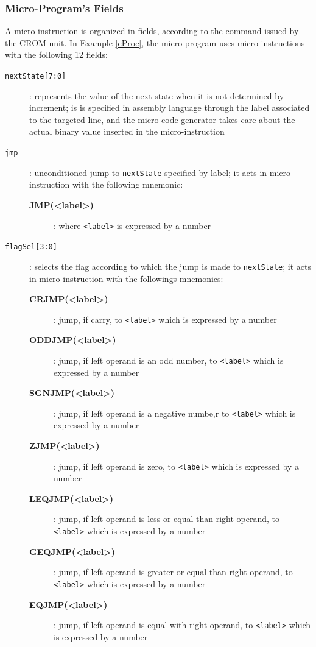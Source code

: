 \subsubsection{Micro-Program's Fields}

A micro-instruction is organized in fields, according to the command issued by the CROM unit. In Example \ref{eProc}, the micro-program uses micro-instructions with the following 12 fields:
\begin{description}
    \item[{\tt nextState[7:0]}]: represents the value of the next state when it is not determined by increment; is is specified in assembly language through the label associated to the targeted line, and the micro-code generator takes care about the actual binary value inserted in the micro-instruction
    \item[{\tt jmp}]: unconditioned jump to {\tt nextState} specified by label; it acts in micro-instruction with the following mnemonic:
        \begin{description}
            \item[{\bf  JMP(<label>)}]: where {\tt <label>} is expressed by a number
        \end{description}
    \item[{\tt flagSel[3:0]}]: selects the flag according to which the jump is made to  {\tt nextState}; it acts in micro-instruction with the followings mnemonics:
    \begin{description}
        \item[{\bf CRJMP(<label>)}]: jump, if carry, to {\tt <label>} which is expressed by a number
        \item[{\bf ODDJMP(<label>)}]: jump, if left operand is an odd number, to {\tt <label>} which is expressed by a number
        \item[{\bf SGNJMP(<label>)}]: jump, if left operand is a negative numbe,r  to {\tt <label>} which is expressed by a number
        \item[{\bf ZJMP(<label>)}]: jump, if left operand is zero,  to {\tt <label>} which is expressed by a number
        \item[{\bf LEQJMP(<label>)}]: jump, if left operand is less or equal than right operand,  to {\tt <label>} which is expressed by a number
        \item[{\bf GEQJMP(<label>)}]: jump, if left operand is greater or equal than right operand,  to {\tt <label>} which is expressed by a number
        \item[{\bf EQJMP(<label>)}]: jump, if left operand is  equal with right operand,  to {\tt <label>} which is expressed by a number

\end{description}
\end{description}
